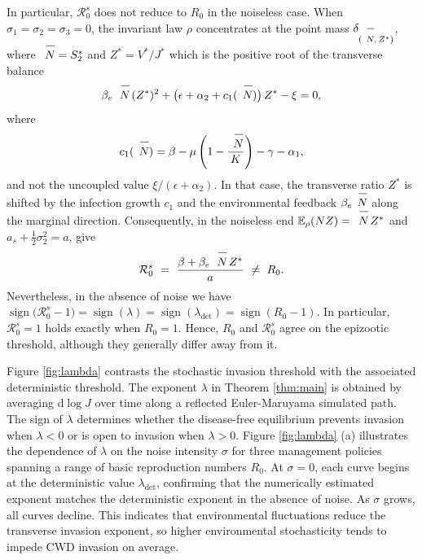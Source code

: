 \documentclass[12pt,a4paper,reqno]{amsart}
\theoremstyle{definition}
\theoremstyle{remark}
\theoremstyle{plain}
\providecommand{\dif}{\mathrm{d}}
\let\svoverline\overline
\newcommand{\uc}[1]{\mkern 5mu\svoverline{\mkern-1mu#1\mkern-0.3mu \rule{0pt}{3.5mm}}\mkern 0mu}
\let\overline\uc
\begin{document}
In particular, $\mathcal R_0^s$ does not reduce to $R_0$ in the noiseless case. When $\sigma_1=\sigma_2=\sigma_3= 0$, the invariant law $\rho$ concentrates at the point mass $\delta_{(\overline N,\,Z^{*})}$, where $\overline N=S_2^{*}$ and $Z^{*}=V^{*}/J^{*}$ which is the positive root of the transverse balance
\begin{equation}\label{eq:Zstar}
\beta_e\,\overline N\,(Z^{*})^{2}
+\big(\epsilon+\alpha_2+c_1(\overline N)\big)\,Z^{*}-\xi=0,
\end{equation} where
$$c_1(\overline N)=\beta-\mu\left(1-\frac{\overline N}{K}\right)-\gamma-\alpha_1,$$
and not the uncoupled value $\xi/(\epsilon+\alpha_2)$. In that case, the transverse ratio $Z^{*}$ is shifted by the infection growth $c_1$ and the environmental feedback $\beta_e\overline N$ along the marginal direction. Consequently, in the noiseless end $\mathbb E_\rho(NZ)=\overline N\,Z^{*}$ and $a_s+\frac12\sigma_2^{2}= a$, give
$$
\mathcal R_0^s\ =\
\frac{\beta+\beta_e\,\overline N\,Z^{*}}{a}\ \neq\ R_0.
$$
Nevertheless, in the absence of noise we have $\operatorname{sign}\big(\mathcal R_0^s-1\big)=\operatorname{sign}(\lambda)=\operatorname{sign}(\lambda_{\det})=\operatorname{sign}(R_0-1)$. In particular, $\mathcal R_0^s=1$ holds exactly when $R_0=1$. Hence, $R_0$ and $\mathcal R_0^s$ agree on the epizootic threshold, although they generally differ away from it.

Figure \ref{fig:lambda} contrasts the stochastic invasion threshold with the associated deterministic threshold. The exponent $\lambda$ in Theorem \ref{thm:main} is obtained by averaging $\dif\log J$ over time along a reflected Euler-Maruyama simulated path. The sign of $\lambda$ determines whether the disease-free equilibrium prevents invasion when $\lambda<0$ or is open to invasion when $\lambda>0$. Figure \ref{fig:lambda} (a) illustrates the dependence of $\lambda$ on the noise intensity $\sigma$ for three management policies spanning a range of basic reproduction numbers $R_0$. At $\sigma=0$, each curve begins at the deterministic value $\lambda_{\det}$, confirming that the numerically estimated exponent matches the deterministic exponent in the absence of noise. As $\sigma$ grows, all curves decline. This indicates that environmental fluctuations reduce the transverse invasion exponent, so higher environmental stochasticity tends to impede CWD invasion on average.
\end{document}
